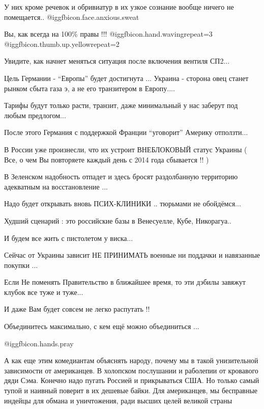 \begin{itemize}
\begin{itemize}
У них кроме речевок и обривиатур в их узкое сознание вообще ничего не
помещается..  @igg{fbicon.face.anxious.sweat} 

Вы, как всегда на 100\% правы !!!  @igg{fbicon.hand.waving}{repeat=3}
@igg{fbicon.thumb.up.yellow}{repeat=2} 

Увидите, как начнет меняться ситуация после включения вентиля СП2...

Цель Германии - \enquote{Европы} будет достигнута ... Украина - сторона овец станет
рынком сбыта газа э, а не его транзитером в Европу....

Тарифы будут только расти, транзит, даже минимальный у нас заберут под любым
предлогом...

После этого Германия с поддержкой Франции \enquote{уговорит} Америку отползти...

В России уже произнесли, что их устроит ВНЕБЛОКОВЫЙ статус Украины ( Все, о чем
Вы повторяете каждый день с 2014 года сбывается !! )

В Зеленском надобность отпадет и здесь бросят раздолбанную территорию
адекватным на восстановление ...

Надо будет открывать вновь ПСИХ-КЛИНИКИ .. тюрьмами не обойдёмся...

Худший сценарий : это российские базы в Венесуелле, Кубе, Никорагуа..

И будем все жить с пистолетом у виска...

Сейчас от Украины зависит НЕ ПРИНИМАТЬ военные ни поддачки и навязанные покупки
...

Если Не поменять Правительство в ближайшее время, то эти дэбилы завяжут клубок
все туже и туже...

И даже Вам будет совсем не легко распутать !!

Объединитесь максимально, с кем ещё можно объединиться ...

 @igg{fbicon.hands.pray} 

\end{itemize} %


А как еще этим комедиантам объяснять народу, почему мы в такой унизительной
зависимости от американцев. В холопском послушании и раболепии от кровавого
дяди Сэма. Конечно надо пугать Россией и прикрываться США. Но только самый
тупой и наивный поверит в их дешевые байки. Для американцев, мы бесправные
индейцы для обмана и уничтожения, ради высших целей великой страны



\end{itemize}
